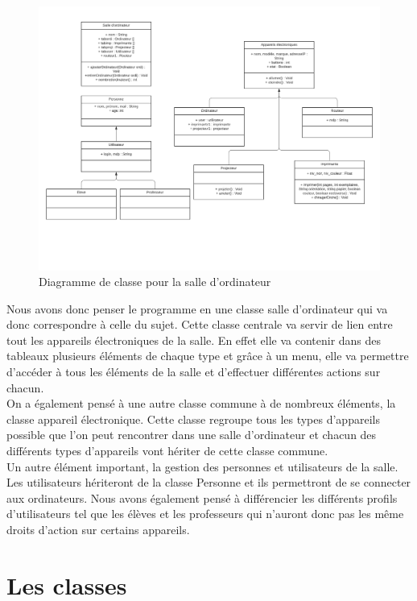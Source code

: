 \documentclass[12,french]{report}
\begin{document}
\begin{figure}[H]
	\center
	\includegraphics[width=1\textwidth]{./Images/UML}
	\caption{Diagramme de classe pour la salle d'ordinateur}
\end{figure}\vspace{0.2cm}

Nous avons donc penser le programme en une classe salle d'ordinateur qui va donc correspondre à celle du sujet. Cette classe centrale va servir de lien entre tout les appareils électroniques de la salle. En effet elle va contenir dans des tableaux plusieurs éléments de chaque type et grâce à un menu, elle va permettre d'accéder à  tous les éléments de la salle et d'effectuer différentes actions sur chacun.\\

On a également pensé à une autre classe commune à de nombreux éléments, la classe appareil électronique. Cette classe regroupe tous les types d'appareils possible que l'on peut rencontrer dans une salle d'ordinateur et chacun des différents types d'appareils vont hériter de cette classe commune.\\

Un autre élément important, la gestion des personnes et utilisateurs de la salle. Les utilisateurs hériteront de la classe Personne et ils permettront de se connecter aux ordinateurs. Nous avons également pensé à différencier les différents profils d'utilisateurs tel que les élèves et les professeurs qui n'auront donc pas les même droits d'action sur certains appareils.


\chapter{Les classes}
\end{document}

